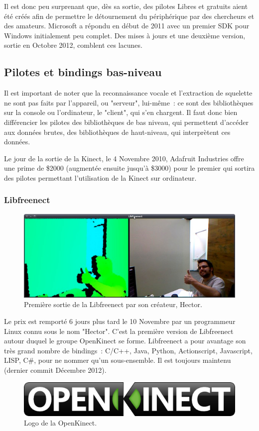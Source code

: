 Il est donc peu surprenant que, dès sa sortie, des pilotes Libres et gratuits
aient été créés afin de permettre le détournement du périphérique par des
chercheurs et des amateurs. Microsoft a répondu en début de 2011 avec un
premier SDK pour Windows initialement peu complet. Des mises à jours et une
deuxième version, sortie en Octobre 2012, comblent ces lacunes\cite{wiki_kinect}.

\subsection{Pilotes et bindings bas-niveau}

Il est important de noter que la reconnaissance vocale et l'extraction de 
squelette ne sont pas faits par l'appareil, ou "serveur", lui-même~: ce sont des
bibliothèques sur la console ou l'ordinateur, le "client", qui s'en chargent. 
Il faut donc bien
différencier les pilotes des bibliothèques de bas niveau, qui permettent 
d'accéder aux données brutes, des
bibliothèques de haut-niveau, qui interprètent ces données.

Le jour de la sortie de la Kinect, le 4 Novembre 2010, Adafruit Industries 
offre une prime de \$2000 (augmentée ensuite jusqu'à \$3000) pour le premier qui
sortira des pilotes permettant l'utilisation de la Kinect sur ordinateur\cite{adafruit_bounty}.

\subsubsection{Libfreenect}
\begin{figure}[h!]
\centering
\includegraphics[width=\linewidth]{images/hector}
\caption{Première sortie de la Libfreenect par son créateur, Hector.}
\end{figure}
Le prix est remporté 6 jours plus tard le 10 Novembre par un programmeur Linux
connu sous le nom "Hector"\cite{adafruit_winner}. C'est la première version de Libfreenect autour
duquel le groupe OpenKinect se forme. Libfreenect a pour avantage son
très grand nombre de bindings~: C/C++, Java, Python, Actionscript, Javascript,
LISP, C\#, pour ne nommer qu'un sous-ensemble. 
Il est toujours maintenu (dernier commit Décembre 2012).
\begin{figure}[h!]
\centering
\includegraphics[width=0.5\linewidth]{images/openkinect_logo}
\caption{Logo de la OpenKinect.}
\end{figure}


